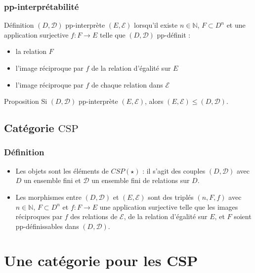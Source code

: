 \documentclass[12pt]{beamer}
\newcommand\csp{\text{CSP}}
\begin{document}
\begin{frame}
    \frametitle{pp-interprétabilité}

    \begin{block}{Définition}
        $(D,\mathcal{D})$
        pp-interprète $(E,\mathcal{E})$ lorsqu'il existe $n \in \mathbb{N}$, $F
        \subset D^n$ et une application surjective $f : F \rightarrow E$ telle que
        $(D,\mathcal{D})$ pp-définit :
        \begin{itemize}
            \item la relation $F$
            \item l'image réciproque par $f$ de la relation d'égalité sur $E$
            \item l'image réciproque par $f$ de chaque relation dans $\mathcal{E}$
        \end{itemize}
    \end{block}
    \pause
    \begin{exampleblock}{Proposition}
        Si $(D,\mathcal{D})$ pp-interprète $(E,\mathcal{E})$, alors
        $(E,\mathcal{E}) \leq (D,\mathcal{D})$.
    \end{exampleblock}
\end{frame}

\subsection{Catégorie $\csp$}

\begin{frame}
    \frametitle{Définition}
    \begin{itemize}[<+->]
        \item Les objets sont les éléments de $CSP(\star)$ : il s'agit des couples
            $(D,\mathcal{D})$ avec $D$ un ensemble fini et $\mathcal{D}$ un
            ensemble fini de relations sur $D$.
        \item Les morphismes entre  $(D,\mathcal{D})$ et  $(E,\mathcal{E})$ sont
            des triplés $(n,F,f)$ avec $n \in \mathbb{N}$, $F \subset D^n$ et $f :
            F \rightarrow E$ une application surjective telle que les images
            réciproques par $f$ des relations de $\mathcal{E}$, de la relation
            d'égalité sur $E$, et $F$ soient pp-définissables dans
            $(D,\mathcal{D})$.
    \end{itemize}
\end{frame}


\section[Catégorie]{Une catégorie pour les CSP}
\end{document}
